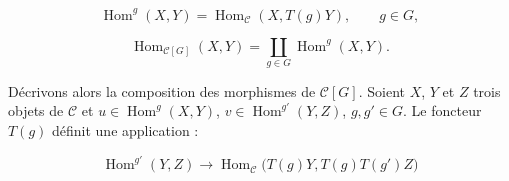 \begin{equation}
  \operatorname{Hom}^{g}(X,Y)
  =\operatorname{Hom}_{\mathcal C}(X,T(g)Y),
  \qquad g\in G,
  \tag{1.3.2.1}
\end{equation}

\begin{equation}
  \operatorname{Hom}_{\mathcal C[G]}(X,Y)
  =\coprod_{g\in G}\operatorname{Hom}^{g}(X,Y).
  \tag{1.3.2.2}
\end{equation}

Décrivons alors la composition des morphismes de $\mathcal C[G]$.
Soient $X$, $Y$ et $Z$ trois objets de $\mathcal C$ et
$u\in\operatorname{Hom}^{g}(X,Y)$,
$v\in\operatorname{Hom}^{g'}(Y,Z)$, $g,g'\in G$. Le foncteur $T(g)$
définit une application :

\begin{equation}
  \operatorname{Hom}^{g'}(Y,Z)
  \longrightarrow
  \operatorname{Hom}_{\mathcal C}
    \bigl(T(g)Y,T(g)T(g')Z\bigr)
  \tag{1.3.2.3}
\end{equation}
